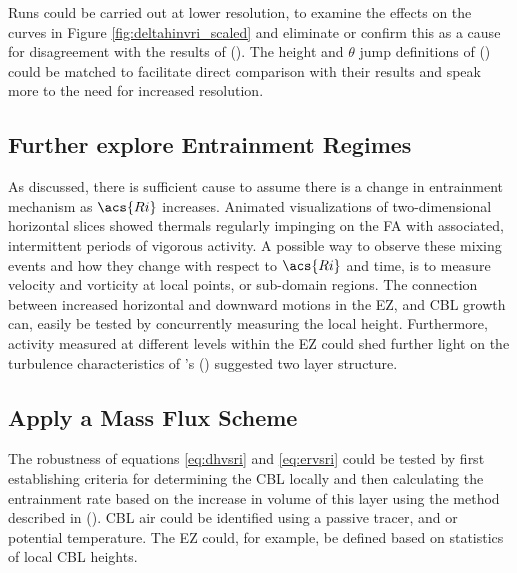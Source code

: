 Runs could be carried out at lower resolution, to examine the effects on the curves in Figure \ref{fig:deltahinvri_scaled} and eliminate or confirm this as a cause for disagreement with the results of \citeauthor{FedConzMir04} (\citeyear{FedConzMir04}).  The height and $\theta$ jump definitions of \citeauthor{GarciaMellado} (\citeyear{GarciaMellado}) could be matched to facilitate direct comparison with their results and speak more to the need for increased resolution.

\subsection{Further explore Entrainment Regimes}

As discussed, there is sufficient cause to assume there is a change in entrainment mechanism as $\acs{Ri}$ increases.  Animated visualizations of two-dimensional horizontal slices showed thermals regularly impinging on the \acs{FA} with associated, intermittent periods of vigorous activity.  A possible way to observe these mixing events and how they change with respect to $\acs{Ri}$ and time, is to measure velocity and vorticity at local points, or sub-domain regions.  The connection between increased horizontal and downward motions in the \acs{EZ}, and \acs{CBL} growth can, easily be tested by concurrently measuring the local height. Furthermore, activity measured at different levels within the \acs{EZ} could shed further light on the turbulence characteristics of \citeauthor{GarciaMellado}'s (\citeyear{GarciaMellado}) suggested two layer structure.\\     

\subsection{Apply a Mass Flux Scheme}

The robustness of equations \ref{eq:dhvsri} and \ref{eq:ervsri} could be tested by first establishing criteria for determining the \acs{CBL} locally and then calculating the entrainment rate based on the increase in volume of this layer using the method described in \citeauthor{DawAus} (\citeyear{DawAus}).  \acs{CBL} air could be identified using a passive tracer, and or potential temperature.  The \acs{EZ} could, for example, be defined based on statistics of local \acs{CBL} heights.   

\FloatBarrier


\endinput

Any text after an \endinput is ignored.
You could put scraps here or things in progress.
